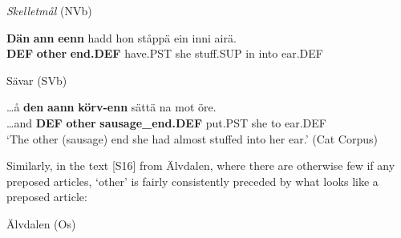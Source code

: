 \item 

\textit{Skelletmål} (NVb)



 \ea\label{}
\gll \textbf{Dän}\textbf{  ann}\textbf{  eenn} hadd  hon  ståppä  ein  inni  airä.\\


\textbf{DEF} \textbf{other} \textbf{end.DEF} have.PST  she  stuff.SUP  in  into  ear.DEF\\

\item 

Sävar (SVb)



 \ea\label{}
\gll …å  \textbf{den}\textbf{  aann}\textbf{  körv-enn} sättä  na  mot  öre.\\


…and  \textbf{DEF} \textbf{other} \textbf{sausage\_end.DEF} put.PST  she  to  ear.DEF\\

\glt ‘The other (sausage) end she had almost stuffed into her ear.’ (Cat Corpus)

\z

Similarly, in the text [S16] from Älvdalen, where there are otherwise few if any preposed articles,  ‘other’ is fairly consistently preceded by what looks like a preposed article:


\item 

Älvdalen (Os)


